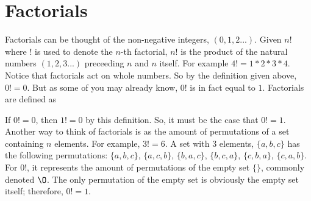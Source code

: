 \documentclass[12pt]{report}
\begin{document}
\section{Factorials}

\hspace{\parindent}Factorials can be thought of the non-negative integers, $(0, 1, 2...)$. Given $n!$ where $!$ is used to denote the $n$-th factorial, $n!$ is the product of the natural numbers $(1, 2, 3...)$ preceeding $n$ and $n$ itself. For example $4!=1*2*3*4$. Notice that factorials act on whole numbers. So by the definition given above, $0!=0$. But as some of you may already know, $0!$ is in fact equal to $1$. Factorials are defined as\bigskip

\bigskip

If $0!=0$, then $1!=0$ by this definition. So, it must be the case that $0!=1$.\\Another way to think of factorials is as the amount of permutations of a set containing $n$ elements. For example, $3!=6$. A set with $3$ elements, $\{a, b, c\}$ has the following permutations: $\{a, b, c\}$, $\{a, c, b\}$, $\{b, a, c\}$, $\{b, c, a\}$, $\{c, b, a\}$, $\{c, a, b\}$. For $0!$, it represents the amount of permutations of the empty set $\{\}$, commonly denoted $\O$. The only permutation of the empty set is obviously the empty set itself; therefore, $0!=1$.
\end{document}
